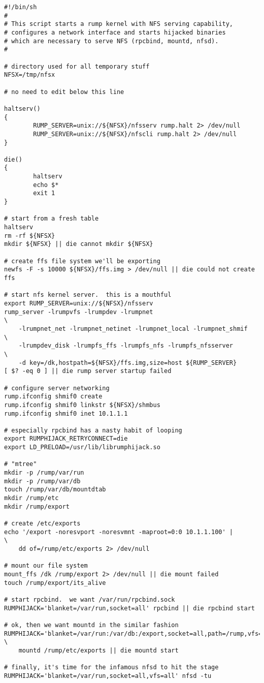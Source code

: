 {\footnotesize
\begin{verbatim}
#!/bin/sh
#
# This script starts a rump kernel with NFS serving capability,
# configures a network interface and starts hijacked binaries
# which are necessary to serve NFS (rpcbind, mountd, nfsd).
#

# directory used for all temporary stuff
NFSX=/tmp/nfsx

# no need to edit below this line

haltserv()
{
        RUMP_SERVER=unix://${NFSX}/nfsserv rump.halt 2> /dev/null
        RUMP_SERVER=unix://${NFSX}/nfscli rump.halt 2> /dev/null
}

die()
{
        haltserv
        echo $*
        exit 1
}

# start from a fresh table
haltserv
rm -rf ${NFSX}
mkdir ${NFSX} || die cannot mkdir ${NFSX}

# create ffs file system we'll be exporting
newfs -F -s 10000 ${NFSX}/ffs.img > /dev/null || die could not create ffs

# start nfs kernel server.  this is a mouthful
export RUMP_SERVER=unix://${NFSX}/nfsserv
rump_server -lrumpvfs -lrumpdev -lrumpnet                               \
    -lrumpnet_net -lrumpnet_netinet -lrumpnet_local -lrumpnet_shmif     \
    -lrumpdev_disk -lrumpfs_ffs -lrumpfs_nfs -lrumpfs_nfsserver         \
    -d key=/dk,hostpath=${NFSX}/ffs.img,size=host ${RUMP_SERVER}
[ $? -eq 0 ] || die rump server startup failed

# configure server networking
rump.ifconfig shmif0 create
rump.ifconfig shmif0 linkstr ${NFSX}/shmbus
rump.ifconfig shmif0 inet 10.1.1.1

# especially rpcbind has a nasty habit of looping
export RUMPHIJACK_RETRYCONNECT=die
export LD_PRELOAD=/usr/lib/librumphijack.so

# "mtree"
mkdir -p /rump/var/run
mkdir -p /rump/var/db
touch /rump/var/db/mountdtab
mkdir /rump/etc
mkdir /rump/export

# create /etc/exports
echo '/export -noresvport -noresvmnt -maproot=0:0 10.1.1.100' |        \
    dd of=/rump/etc/exports 2> /dev/null

# mount our file system
mount_ffs /dk /rump/export 2> /dev/null || die mount failed
touch /rump/export/its_alive

# start rpcbind.  we want /var/run/rpcbind.sock
RUMPHIJACK='blanket=/var/run,socket=all' rpcbind || die rpcbind start

# ok, then we want mountd in the similar fashion
RUMPHIJACK='blanket=/var/run:/var/db:/export,socket=all,path=/rump,vfs=all' \
    mountd /rump/etc/exports || die mountd start

# finally, it's time for the infamous nfsd to hit the stage
RUMPHIJACK='blanket=/var/run,socket=all,vfs=all' nfsd -tu
\end{verbatim}}

